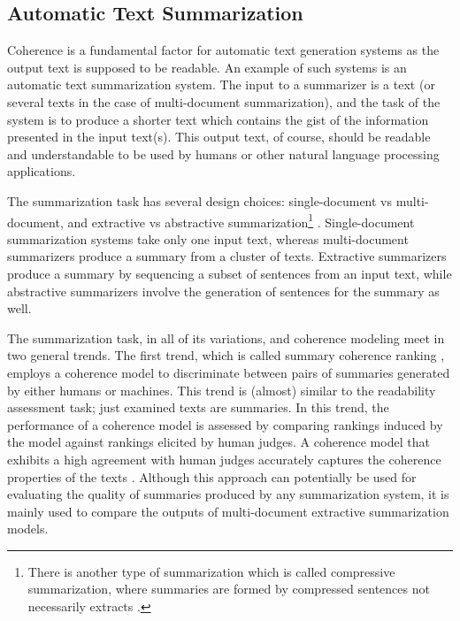 \subsection{Automatic Text Summarization}

Coherence is a fundamental factor for automatic text generation systems as the output text is supposed to be readable. 
An example of such systems is an automatic text summarization system.
The input to a summarizer is a text (or several texts in the case of multi-document summarization), and the task of the system is to produce a shorter text which contains the gist of the information presented in the input text(s). 
This output text, of course, should be readable and understandable to be used by humans or other natural language processing applications. 

The summarization task has several design choices: single-document vs multi-document, and extractive vs abstractive summarization\footnote{There is another type of summarization which is called compressive summarization, where summaries are formed by compressed sentences not necessarily extracts \cite{knight00}.} \cite{hahn00}. 
Single-document summarization systems take only one input text, whereas multi-document summarizers produce a summary from a cluster of texts. 
Extractive summarizers \cite{kupiec95,carbonell98,gillick09} produce a summary by sequencing a subset of sentences from an input text, while abstractive summarizers \cite{wanglu13b,alfonseca13} involve the generation of sentences for the summary as well.   

The summarization task, in all of its variations, and coherence modeling meet in two general trends. 
The first trend, which is called summary coherence ranking \cite{barzilay08,guinaudeau13}, employs a coherence model to discriminate between pairs of summaries generated by either humans or machines. 
This trend is (almost) similar to the readability assessment task; just examined texts are summaries. 
In this trend, the performance of a coherence model is assessed by comparing rankings induced by the model against rankings elicited by human judges. 
A coherence model that exhibits a high agreement with human judges accurately captures the coherence properties of the texts \cite{barzilay08}. 
Although this approach can potentially be used for evaluating the quality of summaries produced by any summarization system, it is mainly used to compare the outputs of multi-document extractive summarization models.  

